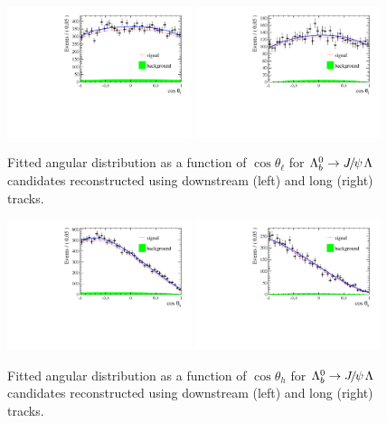 \begin{figure}[h]
\centering
\includegraphics[width=0.48\textwidth]{Lmumu/figs/AngularDistribs/Fitted/Afb_DD_jpsi.pdf}
\includegraphics[width=0.48\textwidth]{Lmumu/figs/AngularDistribs/Fitted/Afb_LL_jpsi.pdf}
\caption{Fitted angular distribution as a function of $\cos\theta_\ell$ for $\Lb\to\jpsi\Lz$ candidates
reconstructed using downstream (left) and long (right) tracks. }
\label{fig:AngFitJpsi}
\end{figure}
%
\begin{figure}[h]
\centering
\includegraphics[width=0.48\textwidth]{Lmumu/figs/AngularDistribs/Fitted/AfbB_DD_jpsi.pdf}
\includegraphics[width=0.48\textwidth]{Lmumu/figs/AngularDistribs/Fitted/AfbB_LL_jpsi.pdf}
\caption{Fitted angular distribution as a function of $\cos\theta_h$ for $\Lb\to\jpsi\Lz$ candidates
reconstructed using downstream (left) and long (right) tracks.  }
\label{fig:AngFitBJpsi}
\end{figure}
